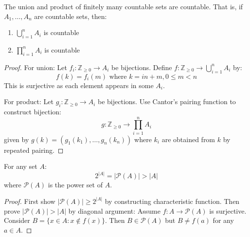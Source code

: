 \begin{proposition}
  The union and product of finitely many countable sets are countable. That is, if $A_1,\ldots,A_n$ are countable sets, then:
  \begin{enumerate}
    \item $\bigcup_{i=1}^n A_i$ is countable
    \item $\prod_{i=1}^n A_i$ is countable
  \end{enumerate}
\end{proposition}

\begin{proof}
  For union: Let $f_i: \mathbb{Z}_{\geq 0} \to A_i$ be bijections.
  Define $f: \mathbb{Z}_{\geq 0} \to \bigcup_{i=1}^n A_i$ by:
  \[
    f(k) = f_i(m) \text{ where } k = in + m, 0 \leq m < n
  \]
  This is surjective as each element appears in some $A_i$.

  For product: Let $g_i: \mathbb{Z}_{\geq 0} \to A_i$ be bijections.
  Use Cantor's pairing function to construct bijection:
  \[
    g: \mathbb{Z}_{\geq 0} \to \prod_{i=1}^n A_i
  \]
  given by $g(k) = (g_1(k_1),\ldots,g_n(k_n))$ where $k_i$ are obtained from $k$ by repeated pairing.
\end{proof}

\begin{theorem}
  For any set $A$:
  \[
    2^{|A|} = |\mathcal{P}(A)| > |A|
  \]
  where $\mathcal{P}(A)$ is the power set of $A$.
\end{theorem}

\begin{proof}
  First show $|\mathcal{P}(A)| \geq 2^{|A|}$ by constructing characteristic function.
  Then prove $|\mathcal{P}(A)| > |A|$ by diagonal argument:
  Assume $f: A \to \mathcal{P}(A)$ is surjective.
  Consider $B = \{x \in A : x \notin f(x)\}$.
  Then $B \in \mathcal{P}(A)$ but $B \neq f(a)$ for any $a \in A$.
\end{proof}